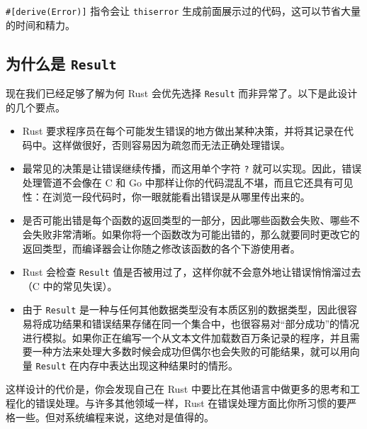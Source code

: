 \texttt{\#[derive(Error)]} 指令会让 \texttt{thiserror} 生成前面展示过的代码，这可以节省大量的时间和精力。

\subsection{为什么是 \texttt{Result}}

现在我们已经足够了解为何 Rust 会优先选择 \texttt{Result} 而非异常了。以下是此设计的几个要点。

\begin{itemize}
\item Rust 要求程序员在每个可能发生错误的地方做出某种决策，并将其记录在代码中。这样做很好，否则容易因为疏忽而无法正确处理错误。
\item 最常见的决策是让错误继续传播，而这用单个字符 \texttt{?} 就可以实现。因此，错误处理管道不会像在 C 和 Go 中那样让你的代码混乱不堪，而且它还具有可见性：在浏览一段代码时，你一眼就能看出错误是从哪里传出来的。
\item 是否可能出错是每个函数的返回类型的一部分，因此哪些函数会失败、哪些不会失败非常清晰。如果你将一个函数改为可能出错的，那么就要同时更改它的返回类型，而编译器会让你随之修改该函数的各个下游使用者。
\item Rust 会检查 \texttt{Result} 值是否被用过了，这样你就不会意外地让错误悄悄溜过去（C 中的常见失误）。
\item 由于 \texttt{Result} 是一种与任何其他数据类型没有本质区别的数据类型，因此很容易将成功结果和错误结果存储在同一个集合中，也很容易对“部分成功”的情况进行模拟。如果你正在编写一个从文本文件加载数百万条记录的程序，并且需要一种方法来处理大多数时候会成功但偶尔也会失败的可能结果，就可以用向量 \texttt{Result} 在内存中表达出现这种结果时的情形。
\end{itemize}

这样设计的代价是，你会发现自己在 Rust 中要比在其他语言中做更多的思考和工程化的错误处理。与许多其他领域一样，Rust 在错误处理方面比你所习惯的要严格一些。但对系统编程来说，这绝对是值得的。

